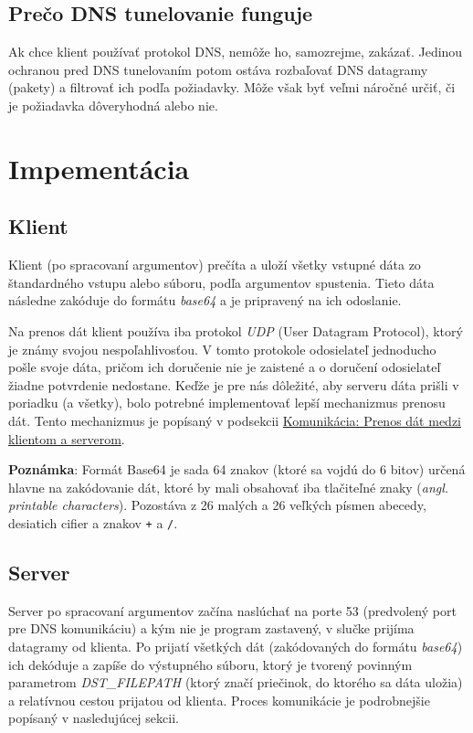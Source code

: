 \documentclass[a4paper]{article}
\begin{document}
  \subsection{Prečo DNS tunelovanie funguje}

  Ak chce klient používať protokol DNS, nemôže ho, samozrejme, zakázať. Jedinou
  ochranou pred DNS tunelovaním potom ostáva rozbaľovať DNS datagramy (pakety)
  a filtrovať ich podľa požiadavky. Môže však byť veľmi náročné určiť, či je
  požiadavka dôveryhodná alebo nie.



  \section{Impementácia}

  \subsection{Klient}

  Klient (po spracovaní argumentov) prečíta a uloží všetky vstupné dáta zo
  štandardného vstupu alebo súboru, podľa argumentov spustenia. Tieto dáta
  následne zakóduje do formátu \textit{base64} a je pripravený na ich
  odoslanie.

  Na prenos dát klient používa iba protokol \textit{UDP} (User Datagram
  Protocol), ktorý je známy svojou nespoľahlivosťou. V tomto protokole
  odosielateľ jednoducho pošle svoje dáta, pričom ich doručenie nie je zaistené
  a o doručení odosielateľ žiadne potvrdenie nedostane. Keďže je pre nás
  dôležité, aby serveru dáta prišli v poriadku (a všetky), bolo potrebné
  implementovať lepší mechanizmus prenosu dát. Tento mechanizmus je popísaný v
  podsekcii \hyperref[label]{Komunikácia: Prenos dát medzi klientom a
  serverom}.

  \textbf{Poznámka}: Formát Base64 je sada 64 znakov (ktoré sa vojdú do 6
  bitov) určená hlavne na zakódovanie dát, ktoré by mali obsahovať iba
  tlačiteľné znaky (\textit{angl. printable characters}). Pozostáva z 26 malých
  a 26 veľkých písmen abecedy, desiatich cifier a znakov \verb|+| a \verb|/|.


  \subsection{Server}
  Server po spracovaní argumentov začína naslúchať na porte 53 (predvolený port
  pre DNS komunikáciu) a kým nie je program zastavený, v slučke prijíma
  datagramy od klienta. Po prijatí všetkých dát (zakódovaných do formátu
  \textit{base64}) ich dekóduje a zapíše do výstupného súboru, ktorý je tvorený
  povinným parametrom \textit{DST\_FILEPATH} (ktorý značí priečinok, do ktorého
  sa dáta uložia) a relatívnou cestou prijatou od klienta. Proces komunikácie
  je podrobnejšie popísaný v nasledujúcej sekcii.
\end{document}
